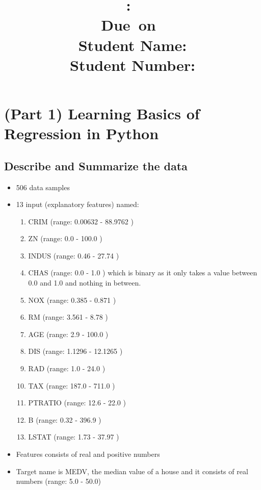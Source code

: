 \documentclass[10pt]{article}
\title{
    \vspace{2in}
    \textmd{\textbf{\hmwkClass:\ \hmwkTitle}}\\
    \vspace{0.1in}\small{Due\ on\ \hmwkDueDate}\\
    \vspace{3in}
    \vspace{0.1in}\large{Student Name: \textbf{\hmwkAuthorName} } \\
    \vspace{0.1in}\large{Student Number: \textbf{\hmwkAuthorNumber} } \\
}
\date{}
\begin{document}
\maketitle
\pagebreak

\begin{center} \tableofcontents \end{center}
\pagebreak

\clearpage
\setcounter{page}{1}

\section{(Part 1) Learning Basics of Regression in Python}

\subsection{Describe and Summarize the data}
\label{sec:rangez}
\begin{itemize}
  \item 506 data samples
  \item 13 input (explanatory features) named:
  \begin{enumerate}
		\item  CRIM (range: 0.00632 - 88.9762 )
		\item  ZN (range: 0.0 - 100.0 )
		\item  INDUS (range: 0.46 - 27.74 )
		\item  CHAS (range: 0.0 - 1.0 ) which is binary as it only takes a value between 0.0 and 1.0 and nothing in between.
		\item  NOX (range: 0.385 - 0.871 )
		\item  RM (range: 3.561 - 8.78 )
		\item  AGE (range: 2.9 - 100.0 )
		\item  DIS (range: 1.1296 - 12.1265 )
		\item  RAD (range: 1.0 - 24.0 )
		\item  TAX (range: 187.0 - 711.0 )
		\item  PTRATIO (range: 12.6 - 22.0 )
		\item  B (range: 0.32 - 396.9 )
		\item  LSTAT (range: 1.73 - 37.97 )
	\end{enumerate}   
  \item Features consists of real and positive numbers
  \item Target name is MEDV, the median value of a house and it consists of real numbers (range: 5.0 - 50.0)
\end{itemize}
\end{document}
